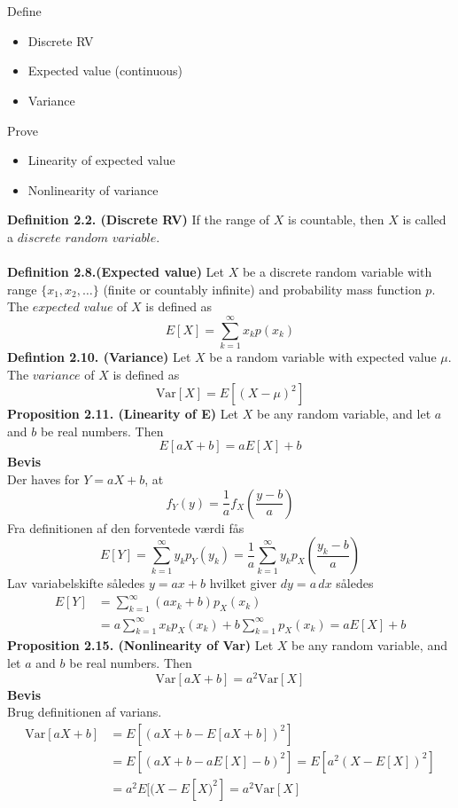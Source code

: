 \documentclass[12pt,a4paper]{report}
\author{Frederik Appel Vardinghus-Nielsen}
\begin{document}
\\\\
Define
\begin{itemize}
\setlength\itemsep{0em}
\item Discrete RV
\item Expected value (continuous)
\item Variance
\end{itemize}
Prove
\begin{itemize}
\setlength\itemsep{0em}
\item Linearity of expected value
\item Nonlinearity of variance
\end{itemize}
\textbf{Definition 2.2. (Discrete RV)} If the range of $X$ is countable, then $X$ is called a $discrete$ $random$ $variable$.\\\\
\textbf{Definition 2.8.(Expected value)} Let $X$ be a discrete random variable with range $\{x_1,x_2,\ldots\}$ (finite or countably infinite) and probability mass function $p$. The $expected$ $value$ of $X$ is defined as
\begin{equation}
E[X]=\sum_{k=1}^{\infty}x_kp(x_k)
\end{equation}
\textbf{Defintion 2.10. (Variance)} Let $X$ be a random variable with expected value $\mu$. The $variance$ of $X$ is defined as
\begin{equation}
\text{Var}[X]=E[(X-\mu)^2]
\end{equation}
\textbf{Proposition 2.11. (Linearity of E)} Let $X$ be any random variable, and let $a$ and $b$ be real numbers. Then
\begin{equation}
E[aX+b]=aE[X]+b
\end{equation}
\textbf{Bevis}\\
Der haves for $Y=aX+b$, at
\begin{equation}
f_Y(y)=\frac{1}{a}f_X\left(\frac{y-b}{a}\right)
\end{equation}
Fra definitionen af den forventede værdi fås
\begin{equation}
E[Y]=\sum_{k=1}^{\infty}\!y_kp_Y(y_k)=\frac{1}{a}\sum_{k=1}^{\infty}\!y_kp_X\left(\frac{y_k-b}{a}\right)
\end{equation}
Lav variabelskifte således $y=ax+b$ hvilket giver $dy=a\,dx$ således
\begin{align*}
E[Y]&=\sum_{k=1}^{\infty}\!(ax_k+b)p_X(x_k)\\
&=a\sum_{k=1}^{\infty}\!x_kp_X(x_k)+b\sum_{k=1}^{\infty}\!p_X(x_k)=aE[X]+b
\end{align*}
\textbf{Proposition 2.15. (Nonlinearity of Var)} Let $X$ be any random variable, and let $a$ and $b$ be real numbers. Then
\begin{equation}
\text{Var}[aX+b]=a^2\text{Var}[X]
\end{equation}
\textbf{Bevis}\\
Brug definitionen af varians.
\begin{align*}
\text{Var}[aX+b]&=E[(aX+b-E[aX+b])^2]\\
&=E[(aX+b-aE[X]-b)^2]=E[a^2(X-E[X])^2]\\
&=a^2E[(X-E[X)^2]=a^2\text{Var}[X]
\end{align*}
\end{document}
